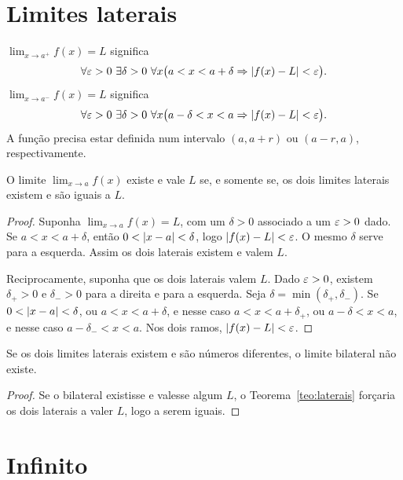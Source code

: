 \documentclass[11pt,a4paper]{article}
\begin{document}
\section{Limites laterais}
\label{sec:laterais}

\begin{definicao}
$\lim_{x\to a^+}f(x)=L$ significa
\[
\forall\eps>0\ \exists\delta>0\ \forall x\bigl(a<x<a+\delta \Rightarrow \abs{f(x)-L}<\eps\bigr).
\]
$\lim_{x\to a^-}f(x)=L$ significa
\[
\forall\eps>0\ \exists\delta>0\ \forall x\bigl(a-\delta<x<a \Rightarrow \abs{f(x)-L}<\eps\bigr).
\]
A fun\c{c}\~ao precisa estar definida num intervalo $(a,a+r)$ ou $(a-r,a)$, respectivamente.
\end{definicao}

\begin{teorema}
\label{teo:laterais}
O limite $\lim_{x\to a}f(x)$ existe e vale $L$ se, e somente se, os dois limites laterais existem e s\~ao iguais a $L$.
\end{teorema}

\begin{proof}
Suponha $\lim_{x\to a}f(x)=L$, com um $\delta>0$ associado a um $\varepsilon>0$ dado. Se $a<x<a+\delta$, ent\~ao $0<\left\lvert x-a \right\rvert<\delta$, logo $\left\lvert f(x)-L \right\rvert<\varepsilon$. O mesmo $\delta$ serve para a esquerda. Assim os dois laterais existem e valem $L$.

Reciprocamente, suponha que os dois laterais valem $L$. Dado $\varepsilon>0$, existem $\delta_+>0$ e $\delta_->0$ para a direita e para a esquerda. Seja $\delta=\min(\delta_+,\delta_-)$. Se $0<\left\lvert x-a \right\rvert<\delta$, ou $a<x<a+\delta$, e nesse caso $a<x<a+\delta_+$, ou $a-\delta<x<a$, e nesse caso $a-\delta_-<x<a$. Nos dois ramos, $\left\lvert f(x)-L \right\rvert<\varepsilon$.
\end{proof}

\begin{corolario}
\label{cor:laterais-distintos}
Se os dois limites laterais existem e s\~ao n\'umeros diferentes, o limite bilateral n\~ao existe.
\end{corolario}

\begin{proof}
Se o bilateral existisse e valesse algum $L$, o Teorema~\ref{teo:laterais} for\c{c}aria os dois laterais a valer $L$, logo a serem iguais.
\end{proof}

\section{Infinito}
\label{sec:infinito}
\end{document}
